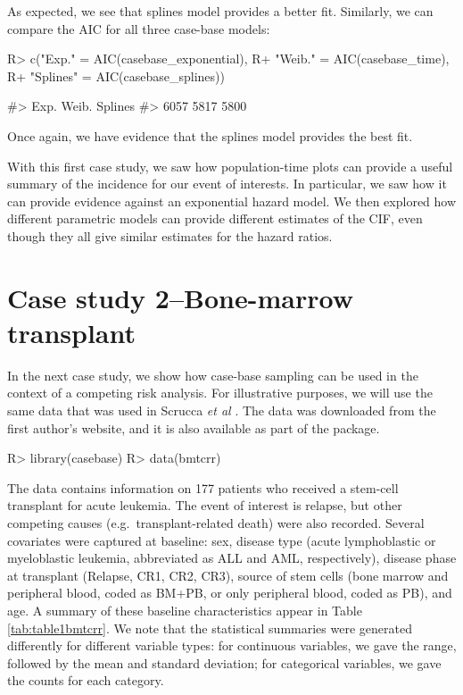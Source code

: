 \documentclass[
]{jss}
\begin{document}
As expected, we see that splines model provides a better fit. Similarly,
we can compare the AIC for all three case-base models:

\begin{CodeChunk}

\begin{CodeInput}
R> c("Exp." = AIC(casebase_exponential),
R+   "Weib." = AIC(casebase_time),
R+   "Splines" = AIC(casebase_splines))
\end{CodeInput}

\begin{CodeOutput}
#>    Exp.   Weib. Splines 
#>    6057    5817    5800
\end{CodeOutput}
\end{CodeChunk}

Once again, we have evidence that the splines model provides the best
fit.

With this first case study, we saw how population-time plots can provide
a useful summary of the incidence for our event of interests. In
particular, we saw how it can provide evidence against an exponential
hazard model. We then explored how different parametric models can
provide different estimates of the CIF, even though they all give
similar estimates for the hazard ratios.

\hypertarget{case-study-2bone-marrow-transplant}{%
\section{Case study 2--Bone-marrow
transplant}\label{case-study-2bone-marrow-transplant}}

In the next case study, we show how case-base sampling can be used in
the context of a competing risk analysis. For illustrative purposes, we
will use the same data that was used in Scrucca \emph{et al}
\citeyearpar{scrucca2010regression}. The data was downloaded from the
first author's website, and it is also available as part of the
 package.

\begin{CodeChunk}

\begin{CodeInput}
R> library(casebase)
R> data(bmtcrr)
\end{CodeInput}
\end{CodeChunk}

The data contains information on 177 patients who received a stem-cell
transplant for acute leukemia. The event of interest is relapse, but
other competing causes (e.g.~transplant-related death) were also
recorded. Several covariates were captured at baseline: sex, disease
type (acute lymphoblastic or myeloblastic leukemia, abbreviated as ALL
and AML, respectively), disease phase at transplant (Relapse, CR1, CR2,
CR3), source of stem cells (bone marrow and peripheral blood, coded as
BM+PB, or only peripheral blood, coded as PB), and age. A summary of
these baseline characteristics appear in Table \ref{tab:table1bmtcrr}.
We note that the statistical summaries were generated differently for
different variable types: for continuous variables, we gave the range,
followed by the mean and standard deviation; for categorical variables,
we gave the counts for each category.
\end{document}
